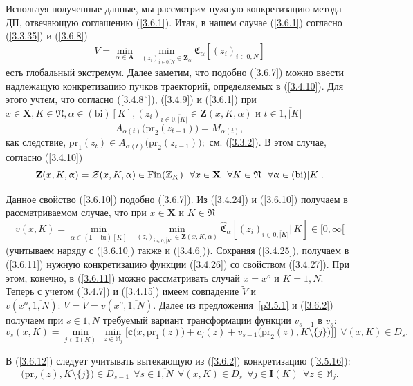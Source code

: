\documentclass[11pt,twoside,openany]{report}
\newcommand{\bfn}{\begin{equation}}
\newcommand{\efn}{\end{equation}}
\newcommand{\ov}{\overline}
\newcommand{\al}{\alpha}
\newcommand{\sm}{\setminus}
\newcommand{\fa}{\forall}
\newcommand{\cz}{{\cal Z}}
\newcommand{\bbz}{{\mathbb Z}}
\newcommand{\bbm}{{\mathbb M}}
\begin{document}
{Используя полученные данные,
мы рассмотрим нужную конкретизацию метода ДП,
отвечающую соглашению (\ref{3.6.1}).
Итак, в нашем случае (\ref{3.6.1})
согласно (\ref{3.3.35}) и (\ref{3.6.8})
\bfn
  \label{3.6.9}
  V = \min\limits_{\al\in \mathbf{A}}\
  \min\limits_{(z_i)_{i\in\ov{0,N}}\in \mathbf{Z}_\al} \mathfrak{C}_\al[(z_i)_{i\in\ov{0,N}}]
\efn
есть глобальный экстремум.
Далее заметим, что подобно (\ref{3.6.7}) можно
ввести надлежащую конкретизацию пучков траекторий, определяемых в (\ref{3.4.10}).
Для этого учтем,
что согласно (\ref{3.4.8`}), (\ref{3.4.9}) и (\ref{3.6.1}) при
$x\in \mathbf{X}, K\in \mathfrak{N}, \al\in (\mathrm{bi})[K],
(z_i)_{i\in\ov{0,|K|}}\in \mathbf{Z}(x,K,\al)$
и $t\in \ov{1,|K|}$
$$
  A_{\al(t)}\bigl(\mathrm{pr}_2(z_{t-1})\bigl) = M_{\al(t)}
  ,
$$
как следствие,
$\mathrm{pr}_1(z_t)\in A_{\al(t)}\bigl(\mathrm{pr}_2(z_{t-1})\bigl);$
см. (\ref{3.3.2}).
В этом случае,
согласно (\ref{3.4.10})
\bfn
  \label{3.6.10}
  \mathbf{Z}(x,K,\al) = \cz(x,K,\al)\in \mathrm{Fin}(\bbz_K)\ \
  \fa x\in \mathbf{X}\ \ \fa K\in \mathfrak{N}\ \ \fa \al\in (\mathrm{bi})[K]
  .
\efn

Данное свойство (\ref{3.6.10}) подобно (\ref{3.6.7}).
Из (\ref{3.4.24}) и
(\ref{3.6.10}) получаем в рассматриваемом случае,
что при $x\in \mathbf{X}$ и
$K\in \mathfrak{N}$
\bfn
  \label{3.6.11}
  v(x,K) = \min\limits_{\al\in (\mathbf{I}-\mathrm{bi})[K]}\ \
  \min\limits_{(z_i)_{i\in\ov{0,|K|}}\in \mathbf{Z}(x,K,\al)}
  \widehat{\mathfrak{C}}_\al[(z_i)_{i\in\ov{0,|K|}}|\,K]\in [0,\infty[
\efn
(учитываем наряду с (\ref{3.6.10}) также и (\ref{3.4.6})).
Сохраняя (\ref{3.4.25}),
получаем в (\ref{3.6.11}) нужную конкретизацию функции
(\ref{3.4.26}) со свойством (\ref{3.4.27}).
При этом, конечно, в (\ref{3.6.11})
можно рассматривать случай
$x=x^o$ и $K = \ov{1,N}.$
Теперь с учетом (\ref{3.4.7})
и (\ref{3.4.15}) имеем совпадение
$\widetilde{V}$ и
$v(x^o,\ov{1,N}):\, V= \widetilde{V}= v(x^o,\ov{1,N}).$
Далее из предложения~\ref{p3.5.1}  и
(\ref{3.6.2})
получаем при
$s\in \ov{1,N}$
требуемый вариант  трансформации
функции $v_{s-1}$ в $v_s:$
\bfn
  \label{3.6.12}
  v_s(x,K) = \min\limits_{j\in \mathbf{I}(K)}\
  \min\limits_{z\in \bbm_j}\bigl[\mathbf{c}\bigl(x,\mathrm{pr}_1(z)\bigl) +
  c_j(z) + v_{s-1}\bigl(\mathrm{pr}_2(z),K\sm\{j\}\bigl)]\bigl]\ \ \fa (x,K)
  \in D_s
  .
\efn

В (\ref{3.6.12}) следует учитывать вытекающую из (\ref{3.6.2})
конкретизацию (\ref{3.5.16}):
\bfn
  \label{3.6.13}
  \bigl(\mathrm{pr}_2(z), K\sm\{j\}\bigl)\in D_{s-1}\ \
  \fa s\in \ov{1,N}\ \ \fa (x,K)\in D_s\ \ \fa j\in \mathbf{I}(K)\ \ \fa z\in
  \bbm_j
  .
\efn

}
\end{document}

